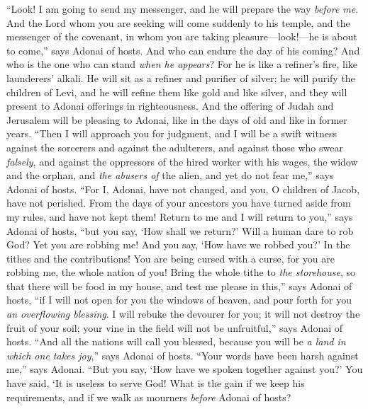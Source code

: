 \begin{biblechapter} %
 “Look! I am going to send my messenger, and he will prepare the way \textit{before me}. And the Lord whom you are seeking will come suddenly to his temple, and the messenger of the covenant, in whom you are taking pleasure—look!—he is about to come,” says Adonai of hosts.
\verse And who can endure the day of his coming? And who is the one who can stand \textit{when he appears}? For he is like a refiner’s fire, like launderers’ alkali.
\verse He will sit as a refiner and purifier of silver; he will purify the children of Levi, and he will refine them like gold and like silver, and they will present to Adonai offerings in righteousness.
\verse And the offering of Judah and Jerusalem will be pleasing to Adonai, like in the days of old and like in former years.
\verse “Then I will approach you for judgment, and I will be a swift witness against the sorcerers and against the adulterers, and against those who swear \textit{falsely}, and against the oppressors of the hired worker with his wages, the widow and the orphan, and \textit{the abusers of} the alien, and yet do not fear me,” says Adonai of hosts.
 “For I, Adonai, have not changed, and you, O children of Jacob, have not perished.
\verse From the days of your ancestors you have turned aside from my rules, and have not kept them! Return to me and I will return to you,” says Adonai of hosts, “but you say, ‘How shall we return?’
\verse Will a human dare to rob God? Yet you are robbing me! And you say, ‘How have we robbed you?’ In the tithes and the contributions!
\verse You are being cursed with a curse, for you are robbing me, the whole nation of you!
\verse Bring the whole tithe to \textit{the storehouse}, so that there will be food in my house, and test me please in this,” says Adonai of hosts, “if I will not open for you the windows of heaven, and pour forth for you \textit{an overflowing blessing}.
\verse I will rebuke the devourer for you; it will not destroy the fruit of your soil; your vine in the field will not be unfruitful,” says Adonai of hosts.
\verse “And all the nations will call you blessed, because you will be \textit{a land in which one takes joy},” says Adonai of hosts.
\verse “Your words have been harsh against me,” says Adonai. “But you say, ‘How have we spoken together against you?’
\verse You have said, ‘It is useless to serve God! What is the gain if we keep his requirements, and if we walk as mourners \textit{before} Adonai of hosts?

\end{biblechapter}
